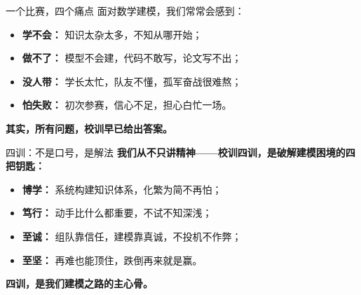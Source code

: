 \begin{frame}{一个比赛，四个痛点}
\justifying
面对数学建模，我们常常会感到：
\vspace{1em}
\begin{itemize}
  \item \textbf{学不会：} 知识太杂太多，不知从哪开始；
  \item \textbf{做不了：} 模型不会建，代码不敢写，论文写不出；
  \item \textbf{没人带：} 学长太忙，队友不懂，孤军奋战很难熬；
  \item \textbf{怕失败：} 初次参赛，信心不足，担心白忙一场。
\end{itemize}

\vspace{1em}
\centering
{\large \textbf{其实，所有问题，校训早已给出答案。}}
\end{frame}

\begin{frame}{四训：不是口号，是解法}
\justifying
\color{blue!60!black}\textbf{我们从不只讲精神——校训四训，是破解建模困境的四把钥匙：}
\vspace{1em}
\begin{itemize}
  \item \textbf{博学：} 系统构建知识体系，化繁为简不再怕；
  \item \textbf{笃行：} 动手比什么都重要，不试不知深浅；
  \item \textbf{至诚：} 组队靠信任，建模靠真诚，不投机不作弊；
  \item \textbf{至坚：} 再难也能顶住，跌倒再来就是赢。
\end{itemize}

\vspace{1em}
\centering
{\large \color{white}\textbf{四训，是我们建模之路的主心骨。}}
\end{frame}


